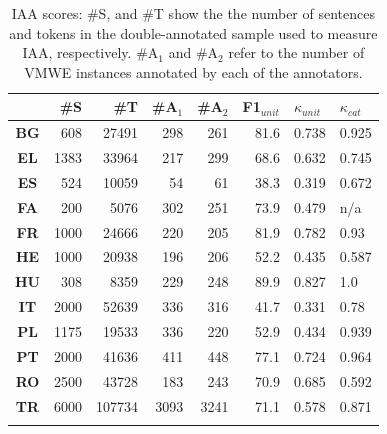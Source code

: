 \documentclass[output=paper,
modfonts,
]{langscibook}
\begin{document}
\begin{table}
\centering
\begin{tabularx}{0.79\textwidth}{c@{\qquad}rrrrrll}
\lsptoprule
& \#S&\#T& \#A$_1$&\#A$_2$& F1$_{\textit{unit}}$ &$\kappa_{\textit{unit}}$&  $\kappa_{\textit{cat}}$\\\midrule
\textbf{BG}	&	608	&	27491	&	298	&	261	&	81.6	&	0.738	&	0.925	\\
\textbf{EL}	&	1383	&	33964	&	217	&	299	&	68.6	&	0.632	&	0.745	\\
\textbf{ES}	&	524	&	10059	&	54	&	61	&	38.3	&	0.319	&	0.672	\\
\textbf{FA}	&	200	&	5076	&	302	&	251	&	73.9	&	0.479	&	n/a	\\
\textbf{FR}	&	1000	&	24666	&	220	&	205	&	81.9	&	0.782	&	0.93	\\
\textbf{HE}	&	1000	&	20938	&	196	&	206	&	52.2	&	0.435	&	0.587	\\
\textbf{HU}	&	308	&	8359	&	229	&	248	&	89.9	&	0.827	&	1.0	\\
\textbf{IT}	&	2000	&	52639	&	336	&	316	&	41.7	&	0.331	&	0.78	\\
\textbf{PL}	&	1175	&	19533	&	336	&	220	&	52.9	&	0.434	&	0.939	\\
\textbf{PT}	&	2000	&	41636	&	411	&	448	&	77.1	&	0.724	&	0.964	\\
\textbf{RO}	&	2500	&	43728	&	183	&	243	&	70.9	&	0.685	&	0.592	\\
\textbf{TR}	&	6000	&	107734	&	3093	&	3241	&	71.1	&	0.578	&	0.871	\\
\lspbottomrule
\end{tabularx}
\caption{IAA scores: \#S, and \#T show the the number of sentences and tokens in the double-annotated sample used to measure IAA, respectively. \#A$_1$ and \#A$_2$ refer to the number of VMWE instances annotated by each of the annotators.  
}
\label{iaa-table}
\end{table}

\end{document}
